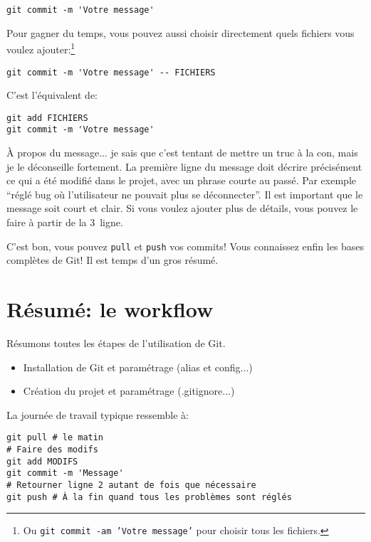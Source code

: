 \documentclass[10pt,a4paper]{article}
\begin{document}
\begin{verbatim}
git commit -m 'Votre message'
\end{verbatim}

Pour gagner du temps, vous pouvez aussi choisir directement quels fichiers vous voulez ajouter:\footnote{Ou \texttt{git commit -am 'Votre message'} pour choisir tous les fichiers.}

\begin{verbatim}
git commit -m 'Votre message' -- FICHIERS
\end{verbatim}

C'est l'équivalent de:

\begin{verbatim}
git add FICHIERS
git commit -m 'Votre message'
\end{verbatim}

À propos du message... je sais que c'est tentant de mettre un truc à la con, mais je le déconseille fortement. La première ligne du message doit décrire précisément ce qui a été modifié dans le projet, avec un phrase courte au passé. Par exemple ``réglé bug où l'utilisateur ne pouvait plus se déconnecter''. Il est important que le message soit court et clair. Si vous voulez ajouter plus de détails, vous pouvez le faire à partir de la 3\ieme~ligne.

C'est bon, vous pouvez {\tt pull} et {\tt push} vos commits! Vous connaissez enfin les bases complètes de Git! Il est temps d'un gros résumé.

\section{Résumé: le workflow}

Résumons toutes les étapes de l'utilisation de Git.

\begin{itemize}
\item Installation de Git et paramétrage (alias et config...)
\item Création du projet et paramétrage (.gitignore...)
\end{itemize}

La journée de travail typique ressemble à:

\begin{verbatim}
git pull # le matin
# Faire des modifs
git add MODIFS
git commit -m 'Message'
# Retourner ligne 2 autant de fois que nécessaire
git push # À la fin quand tous les problèmes sont réglés
\end{verbatim}
\end{document}
